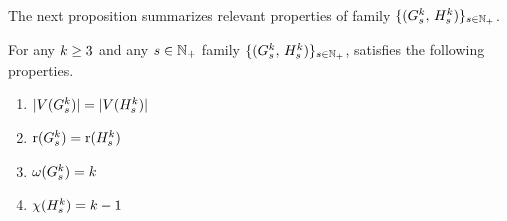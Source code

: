 The next proposition summarizes relevant properties of family $\{(G_s^k,\, H_s^k)\}_{s \in \mathbb{N}_+}$.
\begin{proposition}\label{prop:GraphClassGProps}
    For any  $k \geq 3$ and any $s \in \mathbb{N}_+$ family $\{(G_s^k,\, H_s^k)\}_{s \in \mathbb{N}_+}$, satisfies the following properties.
    \begin{enumerate}
        \item $|V(G_s^k)|= |V(H_s^k)|$ \label{GraphClassGPropsVertexNum}
        \item $\mathrm{r}(G_s^k)=\mathrm{r}(H_s^k)$\label{GraphClassGPropsRegularity}
        \item $\omega(G_s^k) = k$ \label{GraphClassGPropsCliqueNum}
        \item $\chi(H_s^k) = k-1$ \label{GraphClassGPropsChromaticNum}
    \end{enumerate}
\end{proposition}
